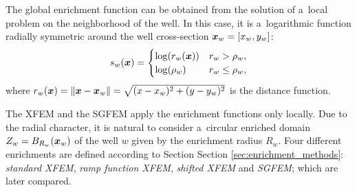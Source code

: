  The global enrichment function can be obtained from the solution of a~local problem on the neighborhood of the well.
 In this case, it is a~logarithmic function radially symmetric around the well cross-section $\mathbf{\boldsymbol{x}}_w=[x_w, y_w]$:
\begin{equation} \label{eqn:enrich_func}
s_w(\mathbf{\boldsymbol{x}}) = 
  \begin{cases}
  \log(r_w(\mathbf{\boldsymbol{x}})) & r_w > \rho_w,\\
  \log(\rho_w) & r_w \le \rho_w,\\
  \end{cases}
\end{equation}
where $r_w(\mathbf{\boldsymbol{x}}) = \|\mathbf{\boldsymbol{x}} - \mathbf{\boldsymbol{x}}_w\|= \sqrt{(x-x_w)^2+(y-y_w)^2}$ is the distance function.

The XFEM and the SGFEM apply the enrichment functions only locally. 
Due to the radial character, it is natural to consider a~circular enriched domain $Z_w = B_{R_w}(\mathbf{\boldsymbol{x}}_w)$
of the well $w$ given by the enrichment radius $R_w$.
Four different enrichments are defined according to Section Section \ref{sec:enrichment_methods}:
\emph{standard XFEM}, \emph{ramp function XFEM}, \emph{shifted XFEM} and \emph{SGFEM}; which are later compared.



